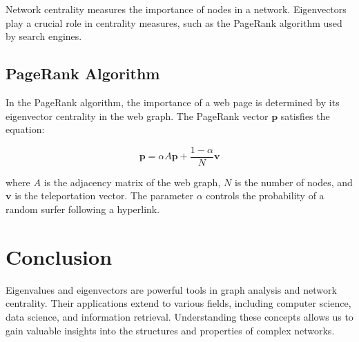 \documentclass{article}
\begin{document}
Network centrality measures the importance of nodes in a network. Eigenvectors play a crucial role in centrality measures, such as the PageRank algorithm used by search engines.

\subsection{PageRank Algorithm}

In the PageRank algorithm, the importance of a web page is determined by its eigenvector centrality in the web graph. The PageRank vector $\mathbf{p}$ satisfies the equation:

\[ \mathbf{p} = \alpha A \mathbf{p} + \frac{1-\alpha}{N}\mathbf{v} \]

where $A$ is the adjacency matrix of the web graph, $N$ is the number of nodes, and $\mathbf{v}$ is the teleportation vector. The parameter $\alpha$ controls the probability of a random surfer following a hyperlink.

\section{Conclusion}

Eigenvalues and eigenvectors are powerful tools in graph analysis and network centrality. Their applications extend to various fields, including computer science, data science, and information retrieval. Understanding these concepts allows us to gain valuable insights into the structures and properties of complex networks.
\end{document}
